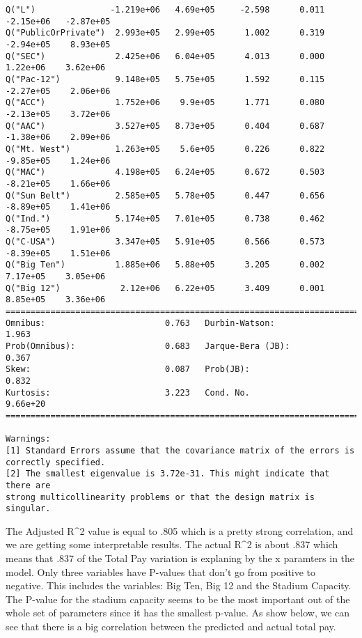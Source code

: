 \documentclass[11pt]{article}
\begin{document}
\begin{Verbatim}[commandchars=\\\{\}]
Q("L")               -1.219e+06   4.69e+05     -2.598      0.011   -2.15e+06   -2.87e+05
Q("PublicOrPrivate")  2.993e+05   2.99e+05      1.002      0.319   -2.94e+05    8.93e+05
Q("SEC")              2.425e+06   6.04e+05      4.013      0.000    1.22e+06    3.62e+06
Q("Pac-12")           9.148e+05   5.75e+05      1.592      0.115   -2.27e+05    2.06e+06
Q("ACC")              1.752e+06    9.9e+05      1.771      0.080   -2.13e+05    3.72e+06
Q("AAC")              3.527e+05   8.73e+05      0.404      0.687   -1.38e+06    2.09e+06
Q("Mt. West")         1.263e+05    5.6e+05      0.226      0.822   -9.85e+05    1.24e+06
Q("MAC")              4.198e+05   6.24e+05      0.672      0.503   -8.21e+05    1.66e+06
Q("Sun Belt")         2.585e+05   5.78e+05      0.447      0.656   -8.89e+05    1.41e+06
Q("Ind.")             5.174e+05   7.01e+05      0.738      0.462   -8.75e+05    1.91e+06
Q("C-USA")            3.347e+05   5.91e+05      0.566      0.573   -8.39e+05    1.51e+06
Q("Big Ten")          1.885e+06   5.88e+05      3.205      0.002    7.17e+05    3.05e+06
Q("Big 12")            2.12e+06   6.22e+05      3.409      0.001    8.85e+05    3.36e+06
==============================================================================
Omnibus:                        0.763   Durbin-Watson:                   1.963
Prob(Omnibus):                  0.683   Jarque-Bera (JB):                0.367
Skew:                           0.087   Prob(JB):                        0.832
Kurtosis:                       3.223   Cond. No.                     9.66e+20
==============================================================================

Warnings:
[1] Standard Errors assume that the covariance matrix of the errors is correctly specified.
[2] The smallest eigenvalue is 3.72e-31. This might indicate that there are
strong multicollinearity problems or that the design matrix is singular.

    \end{Verbatim}

    The Adjusted R\^{}2 value is equal to .805 which is a pretty strong
correlation, and we are getting some interpretable results. The actual
R\^{}2 is about .837 which means that .837 of the Total Pay variation is
explaning by the x paramters in the model. Only three variables have
P-values that don't go from positive to negative. This includes the
variables: Big Ten, Big 12 and the Stadium Capacity. The P-value for the
stadium capacity seems to be the most important out of the whole set of
parameters since it has the smallest p-value. As show below, we can see
that there is a big correlation between the predicted and actual total
pay.
\end{document}
